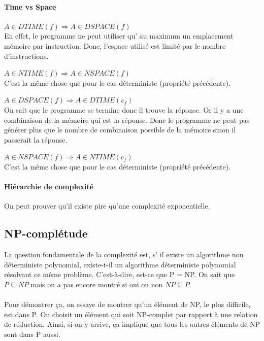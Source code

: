 \paragraph{Time vs Space}
\begin{myprop}
	$A \in DTIME(f) \Rightarrow A \in DSPACE(f)$ \\
	En effet, le programme ne peut utiliser qu’ au maximum un emplacement
	mémoire par instruction. Donc, l'espace utilisé est limité par le
	nombre d'instructions.
\end{myprop}

\begin{myprop}
	$A \in NTIME(f) \Rightarrow A \in NSPACE(f)$ \\
	C'est la même chose que pour le cas déterministe (propriété précédente).
\end{myprop}

\begin{myprop}
	$A \in DSPACE(f) \Rightarrow A \in DTIME(c_f)$ \\
	On sait que le programme se termine donc il trouve la réponse. Or il y
	a une combinaison de la mémoire qui est la réponse. Donc le programme
	ne peut pas générer plus que le nombre de combinaison possible de la
	mémoire sinon il passerait la réponse.
\end{myprop}

\begin{myprop}
	$A \in NSPACE(f) \Rightarrow A \in NTIME(c_f)$ \\
	C'est la même chose que pour le cas déterministe (propriété précédente).
\end{myprop}

\paragraph{Hiérarchie de complexité}
On peut prouver qu'il existe pire qu'une complexité exponentielle.

\subsection{NP-complétude}
La question fondamentale de la complexité est, s’ il existe un algorithme
non déterministe polynomial, existe-t-il un algorithme déterministe polynomial
résolvant ce même problème. C'est-à-dire, est-ce que P = NP. On sait que $P
\subseteq NP$ mais on a pas encore montré si oui ou non $NP\subseteq P$.

\paragraph{} Pour démontrer ça, on essaye de montrer qu'un élément de NP, le
plus difficile, est dans P. On choisit un élément qui soit NP-complet par
rapport à une relation de réduction. Ainsi, si on y arrive, ça implique que
tous les autres éléments de NP sont dans P aussi.

